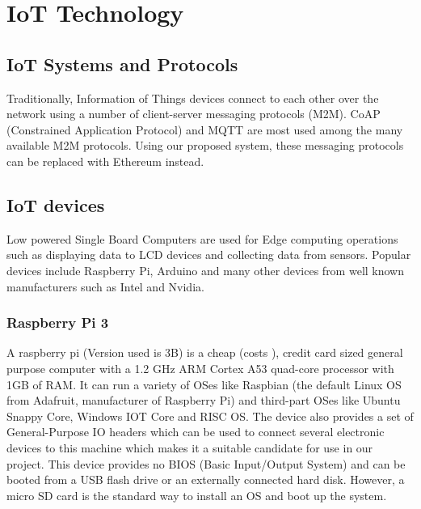 \documentclass[11pt,openright]{report}
\begin{document}
\chapter{IoT Technology}
\label{chapter:iot_tech}
\section{IoT Systems and Protocols}
Traditionally, Information of Things devices connect to each other over the network using a number of client-server messaging protocols (M2M). CoAP (Constrained Application Protocol) and MQTT are most used among the many available M2M protocols. Using our proposed system, these messaging protocols can be replaced with Ethereum instead.


\section{IoT devices}
Low powered Single Board Computers are used for Edge computing operations such as displaying data to LCD devices and collecting data from sensors. Popular devices include Raspberry Pi, Arduino and many other devices from well known manufacturers such as Intel and Nvidia.

\subsection{Raspberry Pi 3}
A raspberry pi (Version used is 3B) is a cheap (costs ), credit card sized general purpose computer with a 1.2 GHz ARM Cortex A53 quad-core processor with 1GB of RAM. It can run a variety of OSes like Raspbian (the default Linux OS from Adafruit, manufacturer of Raspberry Pi) and third-part OSes like Ubuntu Snappy Core, Windows IOT Core and RISC OS. The device also provides a set of General-Purpose IO headers which can be used to connect several electronic devices to this machine which makes it a suitable candidate for use in our project. This device provides no BIOS (Basic Input/Output System) and can be booted from a USB flash drive or an externally connected hard disk. However, a micro SD card is the standard way to install an OS and boot up the system.  
\end{document}
